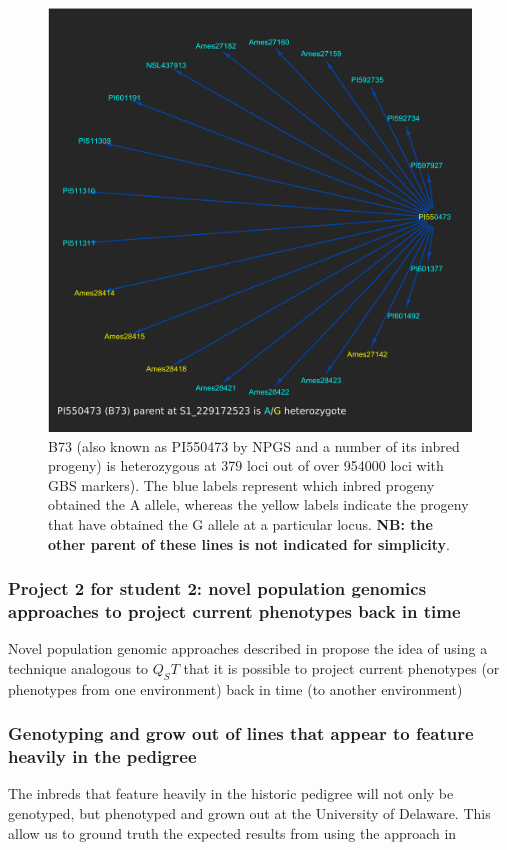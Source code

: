 \documentclass[12pt]{article}
\begin{document}
\begin{figure}[p]
\includegraphics[width=1.0\linewidth]{Pruned.pdf}
\caption{B73 (also known as PI550473 by NPGS and a number of its inbred progeny) is heterozygous at 379 loci out of over 954000 loci with GBS markers). The blue labels represent which inbred progeny obtained the A allele, whereas the yellow labels indicate the progeny that have obtained the G allele at a particular locus. \textbf{NB: the other parent of these lines is not indicated for simplicity}.}
\label{fig:alleledrop}
\end{figure}






\subsubsection*{Project 2 for student 2: novel population genomics approaches to project current phenotypes back in time}
\label{}
Novel population genomic approaches described in \cite{Berg:2014bs} propose the idea of using a technique analogous to $Q_ST$ that it is possible to project current phenotypes (or phenotypes from one environment) back in time (to another environment)

\subsubsection*{Genotyping and grow out of lines that appear to feature heavily in the pedigree}
The inbreds that feature heavily in the historic pedigree will not only be genotyped, but phenotyped and grown out at the University of Delaware. This allow us to ground truth the expected results from using the approach in \cite{Berg:2014bs}
\end{document}
